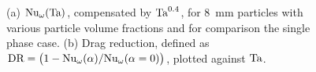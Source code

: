\begin{figure}
\centering%
%
%
\caption{%
(a) $\text{Nu}_\omega (\text{Ta})$, compensated by $\text{Ta}^{0.4}$, for
\SI{8}{\milli\metre} particles with various particle volume fractions and for
comparison the single phase case.  (b) Drag reduction, defined as
$\text{DR} = \left(1 - \text{Nu}_\omega(\alpha) / \text{Nu}_\omega(\alpha=0) \right)$,
plotted against $\text{Ta}$.
}
\label{fig:dragReductionVF}
\end{figure}

